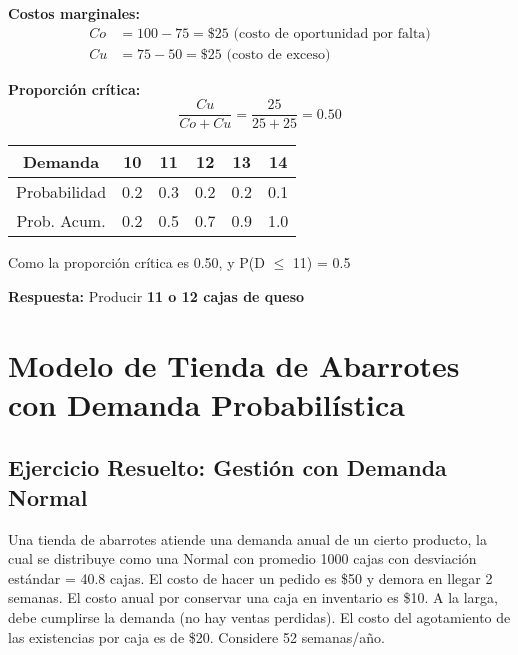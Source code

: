 \documentclass[12pt,a4paper]{book}
\begin{document}
	\begin{tcolorbox}[enhanced,colback=azulclaro,colframe=azulprincipal,boxrule=2pt,arc=8pt,
		title={\bfseries\color{white} \faCalculator\ SOLUCIÓN}]
		
		\textbf{Costos marginales:}
		\begin{align}
			Co &= 100 - 75 = \$25 \text{ (costo de oportunidad por falta)}\\
			Cu &= 75 - 50 = \$25 \text{ (costo de exceso)}
		\end{align}
		
		\textbf{Proporción crítica:}
		\begin{equation}
			\frac{Cu}{Co + Cu} = \frac{25}{25 + 25} = 0.50
		\end{equation}
		
		\begin{center}
			\small
			\begin{tabular}{|c|c|c|c|c|c|}
				\hline
				\rowcolor{azulclaro}
				\textbf{Demanda} & \textbf{10} & \textbf{11} & \textbf{12} & \textbf{13} & \textbf{14} \\
				\hline
				Probabilidad & 0.2 & 0.3 & 0.2 & 0.2 & 0.1 \\
				\hline
				Prob. Acum. & 0.2 & 0.5 & 0.7 & 0.9 & 1.0 \\
				\hline
			\end{tabular}
		\end{center}
		
		Como la proporción crítica es 0.50, y P(D $\leq$ 11) = 0.5
		
		\textbf{Respuesta:} Producir \textbf{11 o 12 cajas de queso}
		
	\end{tcolorbox}
	
	\section{Modelo de Tienda de Abarrotes con Demanda Probabilística}
	
	\subsection{Ejercicio Resuelto: Gestión con Demanda Normal}
	
	\begin{tcolorbox}[enhanced,colback=violetaclaro,colframe=moradoacento,boxrule=2pt,arc=8pt,
		drop shadow,title={\bfseries\color{white} \faPuzzlePiece\ PROBLEMA}]
		
		Una tienda de abarrotes atiende una demanda anual de un cierto producto, la cual se distribuye como una Normal con promedio 1000 cajas con desviación estándar = 40.8 cajas. El costo de hacer un pedido es \$50 y demora en llegar 2 semanas. El costo anual por conservar una caja en inventario es \$10. A la larga, debe cumplirse la demanda (no hay ventas perdidas). El costo del agotamiento de las existencias por caja es de \$20. Considere 52 semanas/año.
		
	\end{tcolorbox}
	
\end{document}
